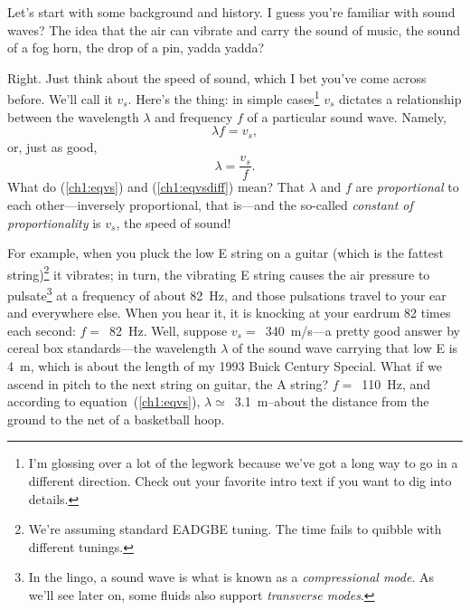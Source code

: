 






Let's start with some background and history. I guess you're familiar with sound
waves? The idea that the air can vibrate and carry the sound of music, the sound
of a fog horn, the drop of a pin, yadda yadda?

Right. Just think about the speed of sound, which I bet you've come across
before. We'll call it $v_s$. Here's the thing: in simple cases\footnote{I'm
  glossing over a lot of the legwork because we've got a long way to go in a
  different direction. Check out your favorite intro text if you want to dig
  into details.}  $v_s$ dictates a relationship between the wavelength $\lambda$
and frequency $f$ of a particular sound wave. Namely,
\begin{equation}
  \label{ch1:eqvs}
  \lambda f = v_s,
\end{equation}
or, just as good,
\begin{equation}
  \label{ch1:eqvsdiff}
  \lambda = \dfrac{v_s}{f}.
\end{equation}
What do (\ref{ch1:eqvs}) and (\ref{ch1:eqvsdiff}) mean? That $\lambda$ and $f$
are \emph{proportional} to each other---inversely proportional, that is---and
the so-called \emph{constant of proportionality} is $v_s$, the speed of
sound!


For example, when you pluck the low E string on a guitar (which is the fattest
string)\footnote{We're assuming standard EADGBE tuning. The time fails to
  quibble with different tunings.} it vibrates; in turn, the vibrating E string
causes the air pressure to pulsate\footnote{In the lingo, a sound wave is what
  is known as a \emph{compressional mode}. As we'll see later on, some fluids
  also support \emph{transverse modes}.} at a frequency of about 82~Hz, and
those pulsations travel to your ear and everywhere else. When you hear it, it is
knocking at your eardrum 82 times each second: $f = $~82~Hz.  Well, suppose
$v_s =$~340~m/s---a pretty good answer by cereal box standards---the wavelength
$\lambda$ of the sound wave carrying that low E is 4~m, which is about the
length of my 1993 Buick Century Special. What if we ascend in pitch to the
next string on guitar, the A string?  $f = $~110~Hz, and according to
equation~(\ref{ch1:eqvs}), $\lambda \simeq$~3.1~m--about the distance from the
ground to the net of a basketball hoop.

